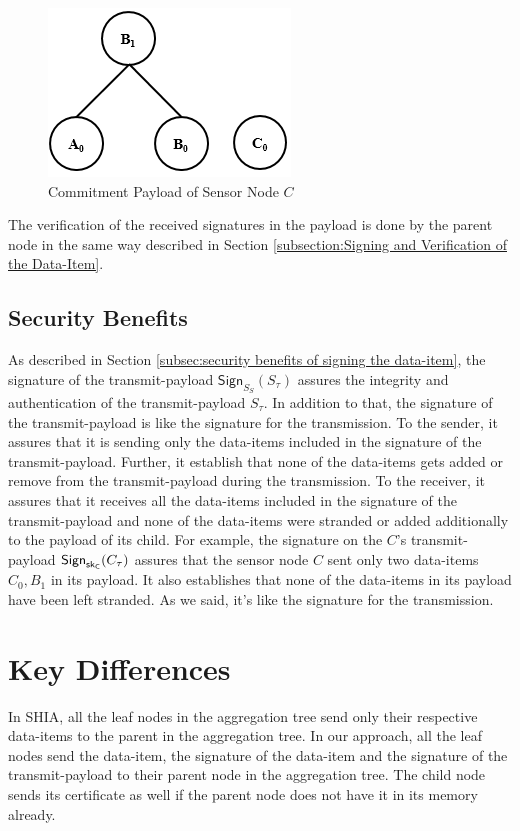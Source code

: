 	\begin{figure}[h!]
		\centering
		\includegraphics[scale = 1]{images/commitment-payload-of-C.png}
		\caption{Commitment Payload of Sensor Node $C$}
		\label{fig:Commitment payload of C}
	\end{figure}
	The verification of the received signatures in the payload is done by the parent node in the same way described in Section \ref{subsection:Signing and Verification of the Data-Item}.

	\subsection{Security Benefits}
		As described in Section \ref{subsec:security benefits of signing the data-item}, the signature of the transmit-payload $\textsf{Sign}_{S_{S}}(S_{\tau})$ assures the integrity and authentication of the transmit-payload $S_{\tau}$.
		In addition to that, the signature of the transmit-payload is like the signature for the transmission.
		To the sender, it assures that it is sending only the data-items included in the signature of the transmit-payload.
		Further, it establish that none of the data-items gets added or remove from the transmit-payload during the transmission. 
		To the receiver, it assures that it receives all the data-items included in the signature of the transmit-payload and none of the data-items were stranded or added additionally to the payload of its child.
		For example, the signature on the $C$'s transmit-payload $\textsf{Sign}_{\sf{sk}_{C}}(C_{\tau})$ assures that the sensor node $C$ sent only two data-items $C_{0},B_{1}$ in its payload.
		It also establishes that none of the data-items in its payload have been left stranded.
		As we said, it's like the signature for the transmission.

\section{Key Differences}

	In SHIA, all the leaf nodes in the aggregation tree send only their respective data-items to the parent in the aggregation tree.
	In our approach, all the leaf nodes send the data-item, the signature of the data-item and the signature of the transmit-payload to their parent node in the aggregation tree. 
	The child node sends its certificate as well if the parent node does not have it in its memory already.

